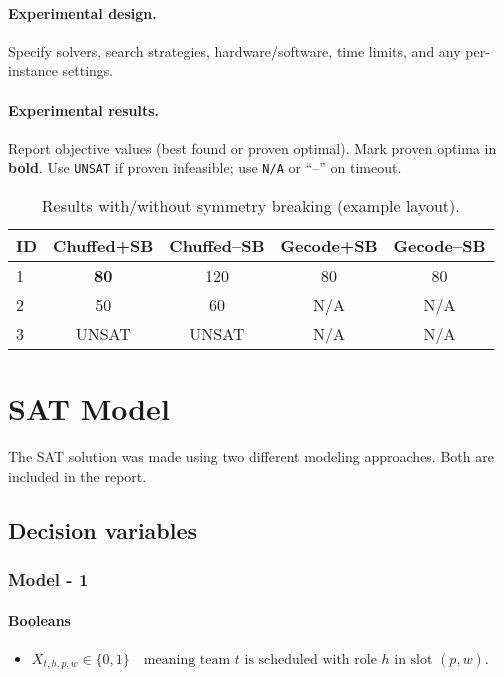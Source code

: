 \documentclass{article}
\begin{document}
\paragraph{Experimental design.}
Specify solvers, search strategies, hardware/software, time limits, and any per-instance settings.

\paragraph{Experimental results.}
Report objective values (best found or proven optimal).
Mark proven optima in \textbf{bold}. Use \texttt{UNSAT} if proven infeasible; use \texttt{N/A} or ``--'' on timeout.

\begin{table}[h]
\centering
\caption{Results with/without symmetry breaking (example layout).}
\label{tab:cp}
\begin{tabular}{lcccc}
\toprule
\textbf{ID} & \textbf{Chuffed+SB} & \textbf{Chuffed--SB} & \textbf{Gecode+SB} & \textbf{Gecode--SB}\\
\midrule
1 & \textbf{80} & 120 & 80 & 80 \\
2 & 50 & 60 & N/A & N/A \\
3 & UNSAT & UNSAT & N/A & N/A \\
\bottomrule
\end{tabular}
\end{table}

\section{SAT Model}

The SAT solution was made using two different modeling approaches. Both are included in the report. 

\subsection{Decision variables}

\subsubsection{Model - 1}

\paragraph{Booleans}

\begin{itemize}
    \item  $ X_{t,h,p,w}\in\{0,1\} \quad\text{meaning team }t\text{ is scheduled with role }h\text{ in slot }(p,w). $
\end{itemize}
\end{document}
